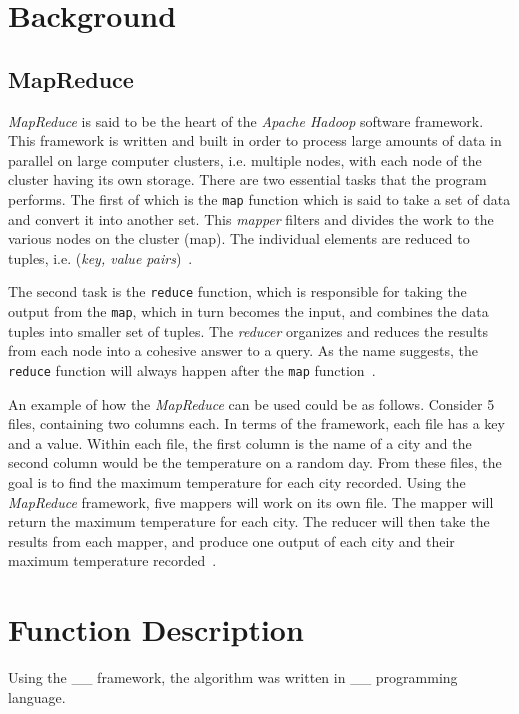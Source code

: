 \documentclass[10pt, conference]{IEEEtran}
\def\code#1{\texttt{#1}}
\begin{document}
\section{Background}
\label{Background}

\subsection{MapReduce}
\label{MapReduce}

\emph{MapReduce} is said to be the heart of the \emph{Apache Hadoop} software framework. This framework is written and built in order to process large amounts of data in parallel on large computer clusters, i.e. multiple nodes, with each node of the cluster having its own storage. There are two essential tasks that the program performs. The first of which is the \code{map} function which is said to take a set of data and convert it into another set. This \emph{mapper} filters and divides the work to the various nodes on the cluster (map). The individual elements are reduced to tuples, i.e. (\emph{key, value pairs})~\cite{WhatIs, IBM, Hadoop}.

The second task is the \code{reduce} function, which is responsible for taking the output from the \code{map}, which in turn becomes the input, and combines the data tuples into smaller set of tuples. The \emph{reducer} organizes and reduces the results from each node into a cohesive answer to a query. As the name suggests, the \code{reduce} function will always happen after the \code{map} function~\cite{WhatIs, IBM, Hadoop}.

An example of how the \emph{MapReduce} can be used could be as follows. Consider 5 files, containing two columns each. In terms of the framework, each file has a key and a value. Within each file, the first column is the name of a city and the second column would be the temperature on a random day. From these files, the goal is to find the maximum temperature for each city recorded. Using the \emph{MapReduce} framework, five mappers will work on its own file. The mapper will return the maximum temperature for each city. The reducer will then take the results from each mapper, and produce one output of each city and their maximum temperature recorded~\cite{IBM}.

\section{Function Description}
\label{Function Description}
Using the \_\_ framework, the algorithm was written in \_\_ programming language.
\end{document}
